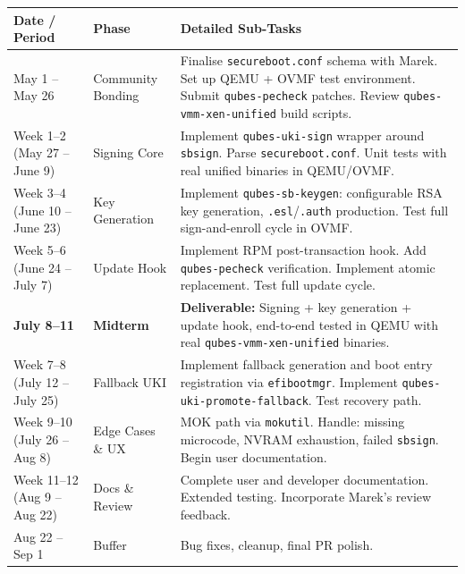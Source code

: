 \documentclass[12pt, a4paper]{article}
\begin{document}
\begin{table}[H]
\centering
\small
\begin{tabular}{p{2.8cm} p{3cm} p{7.5cm}}
\toprule
\textbf{Date / Period} & \textbf{Phase} & \textbf{Detailed Sub-Tasks} \\
\midrule
May 1 -- May 26 & Community Bonding &
Finalise \texttt{secureboot.conf} schema with Marek. Set up QEMU + OVMF test environment. Submit \texttt{qubes-pecheck} patches. Review \texttt{qubes-vmm-xen-unified} build scripts. \\
\midrule
Week 1--2 \newline (May 27 -- June 9) & Signing Core &
Implement \texttt{qubes-uki-sign} wrapper around \texttt{sbsign}. Parse \texttt{secureboot.conf}. Unit tests with real unified binaries in QEMU/OVMF. \\
\midrule
Week 3--4 \newline (June 10 -- June 23) & Key Generation &
Implement \texttt{qubes-sb-keygen}: configurable RSA key generation, \texttt{.esl}/\texttt{.auth} production. Test full sign-and-enroll cycle in OVMF. \\
\midrule
Week 5--6 \newline (June 24 -- July 7) & Update Hook &
Implement RPM post-transaction hook. Add \texttt{qubes-pecheck} verification. Implement atomic replacement. Test full update cycle. \\
\midrule
\textbf{July 8--11} & \textbf{Midterm} &
\textbf{Deliverable:} Signing + key generation + update hook, end-to-end tested in QEMU with real \texttt{qubes-vmm-xen-unified} binaries. \\
\midrule
Week 7--8 \newline (July 12 -- July 25) & Fallback UKI &
Implement fallback generation and boot entry registration via \texttt{efibootmgr}. Implement \texttt{qubes-uki-promote-fallback}. Test recovery path. \\
\midrule
Week 9--10 \newline (July 26 -- Aug 8) & Edge Cases \& UX &
MOK path via \texttt{mokutil}. Handle: missing microcode, NVRAM exhaustion, failed \texttt{sbsign}. Begin user documentation. \\
\midrule
Week 11--12 \newline (Aug 9 -- Aug 22) & Docs \& Review &
Complete user and developer documentation. Extended testing. Incorporate Marek's review feedback. \\
\midrule
Aug 22 -- Sep 1 & Buffer &
Bug fixes, cleanup, final PR polish. \\
\bottomrule
\end{tabular}
\end{table}
\end{document}
